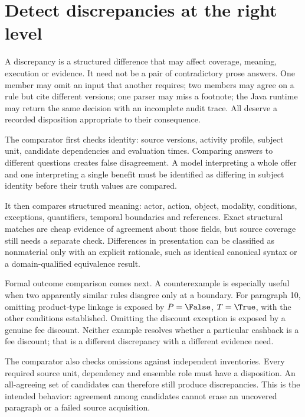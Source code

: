 \section{Detect discrepancies at the right level}
\label{merge:M06:05}


A discrepancy is a structured difference that may affect coverage, meaning,
execution or evidence. It need not be a pair of contradictory prose answers.
One member may omit an input that another requires; two members may agree on a
rule but cite different versions; one parser may miss a footnote; the Java
runtime may return the same decision with an incomplete audit trace. All deserve
a recorded disposition appropriate to their consequence.

The comparator first checks identity: source versions, activity profile, subject
unit, candidate dependencies and evaluation times. Comparing answers to different
questions creates false disagreement. A model interpreting a whole offer and one
interpreting a single benefit must be identified as differing in subject identity
before their truth values are compared.

It then compares structured meaning: actor, action, object, modality, conditions,
exceptions, quantifiers, temporal boundaries and references. Exact structural
matches are cheap evidence of agreement about those fields, but source coverage
still needs a separate check. Differences in presentation can be classified as
nonmaterial only with an explicit rationale, such as identical canonical syntax
or a domain-qualified equivalence result.


Formal outcome comparison comes next. A counterexample is especially useful when
two apparently similar rules disagree only at a boundary. For paragraph 10,
omitting product-type linkage is exposed by $P=\False$, $T=\True$, with the other
conditions established. Omitting the discount exception is exposed by a genuine
fee discount. Neither example resolves whether a particular cashback is a fee
discount; that is a different discrepancy with a different evidence need.

The comparator also checks omissions against independent inventories. Every
required source unit, dependency and ensemble role must have a disposition. An
all-agreeing set of candidates can therefore still produce discrepancies. This
is the intended behavior: agreement among candidates cannot erase an uncovered
paragraph or a failed source acquisition.


